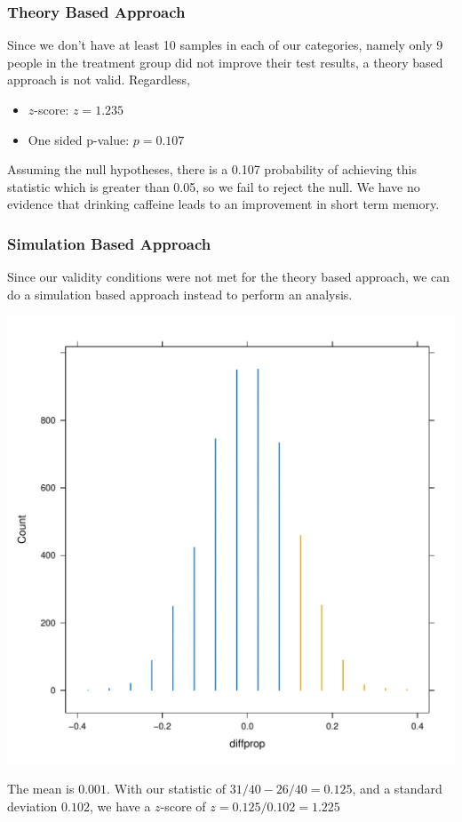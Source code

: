 \documentclass{beamer}
\begin{document}
\begin{frame}
\frametitle{Theory Based Approach}
Since we don't have at least 10 samples in each of our categories, namely only 9 people in the treatment group did not improve their test results, a theory based approach is not valid. Regardless, \pause
\begin{itemize}
	\item $z$-score: $z = 1.235$ \pause
	\item One sided p-value: $p = 0.107$ \pause
\end{itemize}
Assuming the null hypotheses, there is a 0.107 probability of achieving this statistic which is greater than 0.05, so we fail to reject the null. We have no evidence that drinking caffeine leads to an improvement in short term memory.
\end{frame}
\begin{frame}
\frametitle{Simulation Based Approach}
Since our validity conditions were not met for the theory based approach, we can do a simulation based approach instead to perform an analysis. \pause
\begin{center}
	\includegraphics[scale=0.28]{Sim.pdf}
\end{center}
The mean is $0.001$. With our statistic of $31/40 - 26/40 = 0.125$, and a standard deviation $0.102$, we have a $z$-score of $z = 0.125/0.102 = 1.225$
\end{frame}
\end{document}
